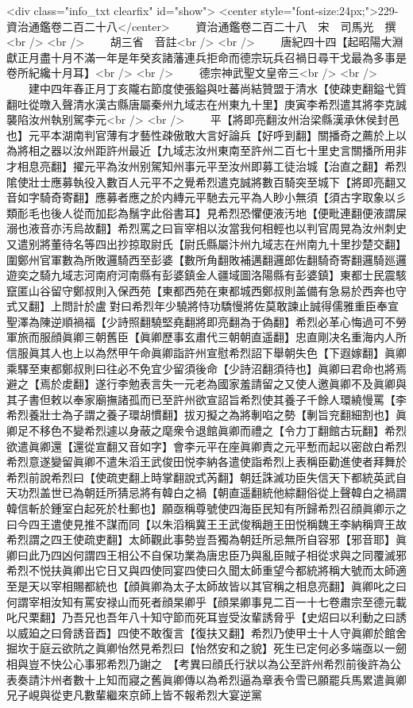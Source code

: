 <div class="info_txt clearfix" id="show">
<center style="font-size:24px;">229-資治通鑑卷二百二十八</center>
  　　資治通鑑卷二百二十八　宋　司馬光　撰<br />
<br />
　　胡三省　音註<br />
<br />
　　唐紀四十四【起昭陽大淵獻正月盡十月不滿一年是年癸亥諸藩連兵拒命而德宗玩兵召禍日尋干戈最為多事是卷所紀纔十月耳】<br />
<br />
　　德宗神武聖文皇帝三<br />
<br />
　　建中四年春正月丁亥隴右節度使張鎰與吐蕃尚結贊盟于清水【使疎吏翻鎰弋質翻吐從暾入聲清水漢古縣唐屬秦州九域志在州東九十里】庚寅李希烈遣其將李克誠襲陷汝州執别駕李元<br />
<br />
　　平【將即亮翻汝州治梁縣漢承休侯封邑也】元平本湖南判官薄有才藝性疎傲敢大言好論兵【好呼到翻】關播奇之薦於上以為將相之器以汝州距許州最近【九域志汝州東南至許州二百七十里史言關播所用非才相息亮翻】擢元平為汝州别駕知州事元平至汝州即募工徒治城【治直之翻】希烈隂使壯士應募執役入數百人元平不之覺希烈遣克誠將數百騎突至城下【將即亮翻又音如字騎奇寄翻】應募者應之於内縳元平馳去元平為人眇小無須【須古字取象以彡類耏毛也後人從而加髟為鬚字此俗書耳】見希烈恐懼便液汚地【便毗連翻便液謂屎溺也液音亦汚烏故翻】希烈罵之曰盲宰相以汝當我何相輕也以判官周晃為汝州刺史又遣别將董待名等四出抄掠取尉氏【尉氏縣屬汴州九域志在州南九十里抄楚交翻】圍鄭州官軍數為所敗邏騎西至彭婆【數所角翻敗補邁翻邏郎佐翻騎奇寄翻邏騎廵邏遊奕之騎九域志河南府河南縣有彭婆鎮金人疆域圖洛陽縣有彭婆鎮】東都士民震駭竄匿山谷留守鄭叔則入保西苑【東都西苑在東都城西鄭叔則盖備有急易於西奔也守式又翻】上問計於盧對曰希烈年少驍將恃功驕慢將佐莫敢諫止誠得儒雅重臣奉宣聖澤為陳逆順禍福【少詩照翻驍堅堯翻將即亮翻為于偽翻】希烈必革心悔過可不勞軍旅而服顔眞卿三朝舊臣【眞卿歷事玄肅代三朝朝直遥翻】忠直剛决名重海内人所信服眞其人也上以為然甲午命眞卿詣許州宣慰希烈詔下舉朝失色【下遐嫁翻】眞卿乘驛至東都鄭叔則曰往必不免宜少留須後命【少詩沼翻須待也】眞卿曰君命也將焉避之【焉於䖍翻】遂行李勉表言失一元老為國家羞請留之又使人邀眞卿不及眞卿與其子書但敕以奉家廟撫諸孤而已至許州欲宣詔旨希烈使其養子千餘人環繞慢罵【李希烈養壯士為子謂之養子環胡慣翻】拔刃擬之為將剸啗之勢【剸旨兖翻細割也】眞卿足不移色不變希烈遽以身蔽之麾衆令退館眞卿而禮之【令力丁翻館古玩翻】希烈欲遣眞卿還【還從宣翻又音如字】會李元平在座眞卿責之元平慙而起以密啟白希烈希烈意遂變留眞卿不遣朱滔王武俊田悦李納各遣使詣希烈上表稱臣勸進使者拜舞於希烈前說希烈曰【使疏吏翻上時掌翻說式芮翻】朝廷誅滅功臣失信天下都統英武自天功烈盖世已為朝廷所猜忌將有韓白之禍【朝直遥翻統他綜翻俗從上聲韓白之禍謂韓信斬於鍾室白起死於杜郵也】願亟稱尊號使四海臣民知有所歸希烈召顔眞卿示之曰今四王遣使見推不謀而同【以朱滔稱冀王王武俊稱趙王田悦稱魏王李納稱齊王故希烈謂之四王使疏吏翻】太師觀此事勢豈吾獨為朝廷所忌無所自容邪【邪音耶】眞卿曰此乃四凶何謂四王相公不自保功業為唐忠臣乃與亂臣賊子相從求與之同覆滅邪希烈不悦扶眞卿出它日又與四使同宴四使曰久聞太師重望今都統將稱大號而太師適至是天以宰相賜都統也【顔眞卿為太子太師故皆以其官稱之相息亮翻】眞卿叱之曰何謂宰相汝知有罵安禄山而死者顔杲卿乎【顔杲卿事見二百一十七卷肅宗至德元載叱尺栗翻】乃吾兄也吾年八十知守節而死耳豈受汝輩誘脅乎【史炤曰以利動之曰誘以威廹之曰脅誘音酉】四使不敢復言【復扶又翻】希烈乃使甲士十人守眞卿於館舍掘坎于庭云欲阬之眞卿怡然見希烈曰【怡然安和之貌】死生已定何必多端亟以一劒相與豈不快公心事邪希烈乃謝之　【考異曰顔氏行狀以為公至許州希烈前後許為公表奏請汴州者數十上知而寢之舊眞卿傳以為希烈逼為章表令雪已願罷兵馬累遣眞卿兄子峴與從吏凡數輩繼來京師上皆不報希烈大宴逆黨